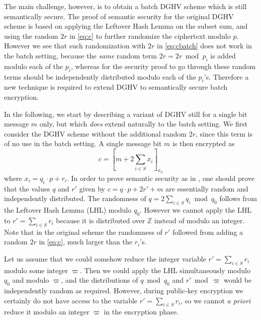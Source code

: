 \documentclass[11pt]{llncs}
\begin{document}
The main challenge, however, is to obtain a batch DGHV scheme which is
still semantically secure. The proof of semantic security for the
original DGHV scheme is  based on applying the Leftover Hash Lemma on the
subset sum, and using the random $2r$ in \eqref{eq:c} to further
randomize the ciphertext modulo $p$. However we see that such
randomization with $2r$ in \eqref{eq:cbatch} does not work in the batch
setting, because the \emph{same} random term $2r=2r \bmod p_i$ is added
modulo each of the $p_i$, whereas for the security proof to go through
these random terms should be independently distributed modulo each of the
$p_i$'s. Therefore a new technique is required to extend DGHV to
semantically secure batch encryption.

In the following, we start by describing a variant of DGHV still for a
single bit message $m$ only, but which \emph{does} extend naturally to the
batch setting. We first consider the DGHV scheme without the additional
random $2r$, since this term is of no use in the batch setting. A single
message bit $m$ is then encrypted as
\[
    c = \left[m + 2\sum\limits_{i\in S} x_i\right]_{x_0}
\]
where $x_i=q_i \cdot p+r_i$. In order to prove semantic security as in
\cite{vDGHV2010}, one should prove that the values $q$ and $r'$ given by
$c=q \cdot p+2r'+m$ are essentially random and independently distributed.
The randomness of $q=2\sum_{i \in S} q_i \bmod q_0$ follows from the
Leftover Hash Lemma (LHL) modulo $q_0$. However we cannot apply the LHL
to $r'=\sum_{i \in S} r_i$ because it is distributed over ${\mathbb Z}$
instead of modulo an integer. Note that in the original scheme the
randomness of $r'$ followed from adding a random $2r$ in \eqref{eq:c},
much larger than the $r_i$'s.

Let us assume that we could somehow reduce the integer variable
$r'=\sum_{i \in S} r_i$ modulo some integer $\varpi$. Then we could apply
the LHL simultaneously modulo $q_0$ and modulo $\varpi$, and the
distributions of $q \bmod q_0$ and $r' \bmod \varpi$ would be
independently random as required. However, during public-key encryption
we certainly do not have access to the variable $r'=\sum_{i \in S} r_i$,
so we cannot \emph{a priori} reduce it modulo an integer $\varpi$ in the
encryption phase.
\end{document}
